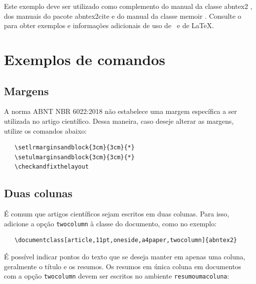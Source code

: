 \documentclass[
	article,			%
	11pt,				%
	oneside,			%
	a4paper,			%
	english,			%
	brazil,				%
	sumario=tradicional
	]{abntex2}
\begin{document}
Este exemplo deve ser utilizado como complemento do manual da classe
\textsf{abntex2} \cite{abntex2classe}, dos manuais do pacote
\textsf{abntex2cite} \cite{abntex2cite,abntex2cite-alf} e do manual da classe
\textsf{memoir} \cite{memoir}. Consulte o  para obter
exemplos e informações adicionais de uso de \abnTeX\ e de \LaTeX.

\section{Exemplos de comandos}

\subsection{Margens}

A norma ABNT NBR 6022:2018 não estabelece uma margem específica a ser utilizada
no artigo científico. Dessa maneira, caso deseje alterar as margens, utilize os
comandos abaixo:

\begin{verbatim}
   \setlrmarginsandblock{3cm}{3cm}{*}
   \setulmarginsandblock{3cm}{3cm}{*}
   \checkandfixthelayout
\end{verbatim}

\subsection{Duas colunas}

É comum que artigos científicos sejam escritos em duas colunas. Para isso,
adicione a opção \texttt{twocolumn} à classe do documento, como no exemplo:

\begin{verbatim}
   \documentclass[article,11pt,oneside,a4paper,twocolumn]{abntex2}
\end{verbatim}

É possível indicar pontos do texto que se deseja manter em apenas uma coluna,
geralmente o título e os resumos. Os resumos em única coluna em documentos com
a opção \texttt{twocolumn} devem ser escritos no ambiente
\texttt{resumoumacoluna}:
\end{document}
